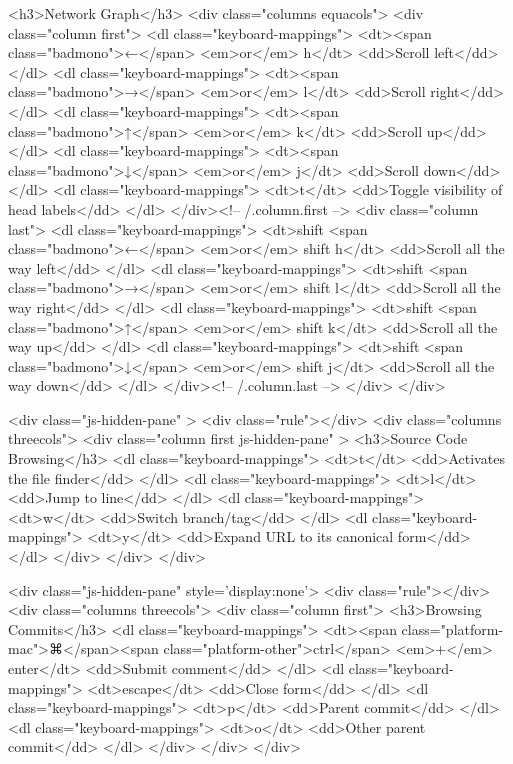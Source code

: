    <h3>Network Graph</h3>
    <div class="columns equacols">
      <div class="column first">
        <dl class="keyboard-mappings">
          <dt><span class="badmono">←</span> <em>or</em> h</dt>
          <dd>Scroll left</dd>
        </dl>
        <dl class="keyboard-mappings">
          <dt><span class="badmono">→</span> <em>or</em> l</dt>
          <dd>Scroll right</dd>
        </dl>
        <dl class="keyboard-mappings">
          <dt><span class="badmono">↑</span> <em>or</em> k</dt>
          <dd>Scroll up</dd>
        </dl>
        <dl class="keyboard-mappings">
          <dt><span class="badmono">↓</span> <em>or</em> j</dt>
          <dd>Scroll down</dd>
        </dl>
        <dl class="keyboard-mappings">
          <dt>t</dt>
          <dd>Toggle visibility of head labels</dd>
        </dl>
      </div><!-- /.column.first -->
      <div class="column last">
        <dl class="keyboard-mappings">
          <dt>shift <span class="badmono">←</span> <em>or</em> shift h</dt>
          <dd>Scroll all the way left</dd>
        </dl>
        <dl class="keyboard-mappings">
          <dt>shift <span class="badmono">→</span> <em>or</em> shift l</dt>
          <dd>Scroll all the way right</dd>
        </dl>
        <dl class="keyboard-mappings">
          <dt>shift <span class="badmono">↑</span> <em>or</em> shift k</dt>
          <dd>Scroll all the way up</dd>
        </dl>
        <dl class="keyboard-mappings">
          <dt>shift <span class="badmono">↓</span> <em>or</em> shift j</dt>
          <dd>Scroll all the way down</dd>
        </dl>
      </div><!-- /.column.last -->
    </div>
  </div>

  <div class="js-hidden-pane" >
    <div class="rule"></div>
    <div class="columns threecols">
      <div class="column first js-hidden-pane" >
        <h3>Source Code Browsing</h3>
        <dl class="keyboard-mappings">
          <dt>t</dt>
          <dd>Activates the file finder</dd>
        </dl>
        <dl class="keyboard-mappings">
          <dt>l</dt>
          <dd>Jump to line</dd>
        </dl>
        <dl class="keyboard-mappings">
          <dt>w</dt>
          <dd>Switch branch/tag</dd>
        </dl>
        <dl class="keyboard-mappings">
          <dt>y</dt>
          <dd>Expand URL to its canonical form</dd>
        </dl>
      </div>
    </div>
  </div>

  <div class="js-hidden-pane" style='display:none'>
    <div class="rule"></div>
    <div class="columns threecols">
      <div class="column first">
        <h3>Browsing Commits</h3>
        <dl class="keyboard-mappings">
          <dt><span class="platform-mac">⌘</span><span class="platform-other">ctrl</span> <em>+</em> enter</dt>
          <dd>Submit comment</dd>
        </dl>
        <dl class="keyboard-mappings">
          <dt>escape</dt>
          <dd>Close form</dd>
        </dl>
        <dl class="keyboard-mappings">
          <dt>p</dt>
          <dd>Parent commit</dd>
        </dl>
        <dl class="keyboard-mappings">
          <dt>o</dt>
          <dd>Other parent commit</dd>
        </dl>
      </div>
    </div>
  </div>

